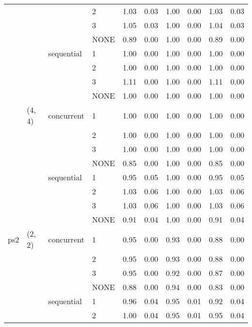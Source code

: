 \begin{tabular}{llllrrrrrr}
    &        &            & 2 &     1.03 & 0.03 &     1.00 & 0.00 &  1.03 & 0.03 \\
    &        &            & 3 &     1.05 & 0.03 &     1.00 & 0.00 &  1.04 & 0.03 \\
    &        &            & NONE &     0.89 & 0.00 &     1.00 & 0.00 &  0.89 & 0.00 \\
    &        & sequential & 1 &     1.00 & 0.00 &     1.00 & 0.00 &  1.00 & 0.00 \\
    &        &            & 2 &     1.00 & 0.00 &     1.00 & 0.00 &  1.00 & 0.00 \\
    &        &            & 3 &     1.11 & 0.00 &     1.00 & 0.00 &  1.11 & 0.00 \\
    &        &            & NONE &     1.00 & 0.00 &     1.00 & 0.00 &  1.00 & 0.00 \\
    & (4, 4) & concurrent & 1 &     1.00 & 0.00 &     1.00 & 0.00 &  1.00 & 0.00 \\
    &        &            & 2 &     1.00 & 0.00 &     1.00 & 0.00 &  1.00 & 0.00 \\
    &        &            & 3 &     1.00 & 0.00 &     1.00 & 0.00 &  1.00 & 0.00 \\
    &        &            & NONE &     0.85 & 0.00 &     1.00 & 0.00 &  0.85 & 0.00 \\
    &        & sequential & 1 &     0.95 & 0.05 &     1.00 & 0.00 &  0.95 & 0.05 \\
    &        &            & 2 &     1.03 & 0.06 &     1.00 & 0.00 &  1.03 & 0.06 \\
    &        &            & 3 &     1.03 & 0.06 &     1.00 & 0.00 &  1.03 & 0.06 \\
    &        &            & NONE &     0.91 & 0.04 &     1.00 & 0.00 &  0.91 & 0.04 \\
ps2 & (2, 2) & concurrent & 1 &     0.95 & 0.00 &     0.93 & 0.00 &  0.88 & 0.00 \\
    &        &            & 2 &     0.95 & 0.00 &     0.93 & 0.00 &  0.88 & 0.00 \\
    &        &            & 3 &     0.95 & 0.00 &     0.92 & 0.00 &  0.87 & 0.00 \\
    &        &            & NONE &     0.88 & 0.00 &     0.94 & 0.00 &  0.83 & 0.00 \\
    &        & sequential & 1 &     0.96 & 0.04 &     0.95 & 0.01 &  0.92 & 0.04 \\
    &        &            & 2 &     1.00 & 0.04 &     0.95 & 0.01 &  0.95 & 0.04 \\

\end{tabular}
